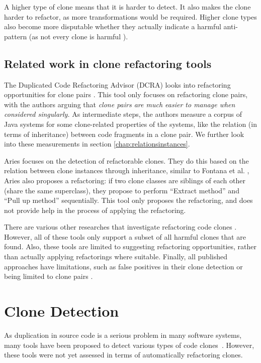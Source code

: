 \documentclass[a4paper]{article}
\begin{document}
A higher type of clone means that it is harder to detect. It also makes the clone harder to refactor, as more transformations would be required. Higher clone types also become more disputable whether they actually indicate a harmful anti-pattern (as not every clone is harmful \cite{jarzabek2010clones, kapser2008cloning}).

\subsection{Related work in clone refactoring tools}
The Duplicated Code Refactoring Advisor (DCRA) looks into refactoring opportunities for clone pairs \cite{fontana2012duplicated, fontana2015duplicated}. This tool only focuses on refactoring clone pairs, with the authors arguing that \textit{clone pairs are much easier to manage when considered singularly.} As intermediate steps, the authors measure a corpus of Java systems for some clone-related properties of the systems, like the relation (in terms of inheritance) between code fragments in a clone pair. We further look into these measurements in section \ref{chap:relationsinstances}.

Aries \cite{higo2004aries, higo2008metric} focuses on the detection of refactorable clones. They do this based on the relation between clone instances through inheritance, similar to Fontana et al. \cite{fontana2012duplicated}, Aries also proposes a refactoring: if two clone classes are siblings of each other (share the same superclass), they propose to perform ``Extract method'' and ``Pull up method'' sequentially. This tool only proposes the refactoring, and does not provide help in the process of applying the refactoring.

There are various other researches that investigate refactoring code clones \cite{alwaqfi2017refactoring, chen2018clone, koni2001scenario}. However, all of these tools only support a subset of all harmful clones that are found. Also, these tools are limited to suggesting refactoring opportunities, rather than actually applying refactorings where suitable. Finally, all published approaches have limitations, such as false positives in their clone detection \cite{chen2018clone} or being limited to clone pairs \cite{higo2008metric}.

\section{Clone Detection}\label{chap:clonedetection}
As duplication in source code is a serious problem in many software systems, many tools have been proposed to detect various types of code clones~\cite{sheneamer2016survey, svajlenko2014evaluating}. However, these tools were not yet assessed in terms of automatically refactoring clones.
\end{document}

